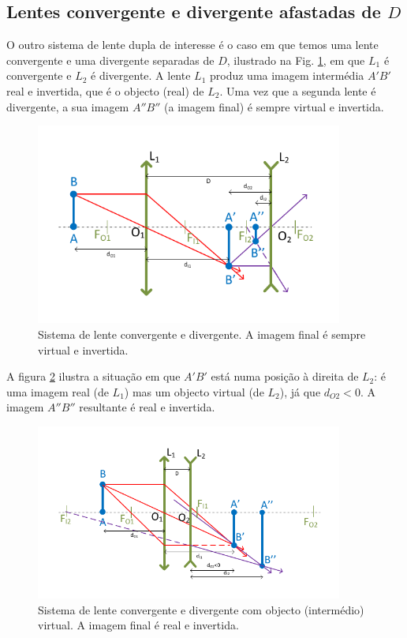 \documentclass[a4paper,12pt]{article}      %
\begin{document}
\subsection{\sf Lentes convergente e divergente afastadas de $D$}
O outro sistema de lente dupla de interesse é o caso em que temos uma lente convergente e uma divergente separadas de $D$, ilustrado na Fig. \ref{fig:DuplaConvDiv1}, em que $L_1$ é convergente e $L_2$ é divergente. A lente $L_1$ produz uma imagem intermédia $A'B'$ real e invertida, que é o objecto (real) de $L_2$. Uma vez que a segunda lente é divergente, a sua imagem $A''B''$ (a imagem final) é sempre virtual e invertida.

\begin{figure}	[!htb]  \centering 
	\includegraphics[width=0.9\textwidth]{11-DuplaConvDiv1}
	\caption{Sistema de lente convergente e divergente. A imagem final é sempre virtual e invertida. \label{fig:DuplaConvDiv1}} 
\end{figure}

A figura \ref{fig:DuplaConvDiv2} ilustra a situação em que $A'B'$ está numa posição à direita de $L_2$: é uma imagem real (de $L_1$) mas um objecto virtual (de $L_2$), já que $d_{O2}<0$. A imagem $A''B''$ resultante é real e invertida.

\begin{figure}	[!htb] 
\begin{center}
	\includegraphics[width=0.9\textwidth]{12-DuplaConvDiv2}
	\caption{Sistema de lente convergente e divergente com objecto (intermédio) virtual. A imagem final é real e invertida. \label{fig:DuplaConvDiv2}} 
\end{center}
\end{figure}
\end{document}
